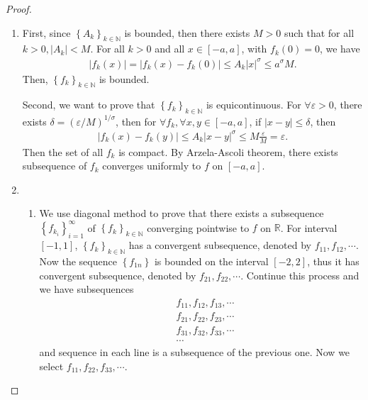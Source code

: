 \documentclass[11pt]{article}
\theoremstyle{definition}
\numberwithin{equation}{subsection}
\begin{document}
\begin{proof}
~\begin{enumerate}[label=(\alph*)]
    \item First, since $\left\{A_k\right\}_{k\in \mathbb{N}}$ is bounded, then there exists $M > 0$ such that for all $k > 0, \left|A_k\right| < M$. For all $k > 0$ and all $x\in [-a,a]$, with $f_k(0) = 0$, we have
    \begin{align*}
        \left|f_k(x)\right| = \left|f_k(x) - f_k(0)\right| \leq A_k |x|^\sigma \leq a^\sigma M.
    \end{align*}
    Then, $\left\{f_k\right\}_{k\in \mathbb{N}}$ is bounded.
    
    Second, we want to prove that $\left\{f_k\right\}_{k\in \mathbb{N}}$ is equicontinuous. For $\forall \varepsilon > 0$, there exists $\delta = \left(\varepsilon/M\right)^{1/\sigma}$, then for $\forall f_k, \forall x, y \in [-a,a]$, if $|x - y| \leq \delta$, then 
    \begin{align*}
        \left|f_k(x) - f_k(y)\right| \leq A_k |x - y|^\sigma \leq M \frac{\varepsilon}{M} = \varepsilon.
    \end{align*}
    Then the set of all $f_k$ is compact. By Arzela-Ascoli theorem, there exists subsequence of $f_k$ converges uniformly to $f$ on $[-a,a]$.
    
    \item 
    \begin{enumerate}[label = \arabic*)]
        \item We use diagonal method to prove that there exists a subsequence $\left\{f_{k_i}\right\}^\infty_{i=1}$ of $\left\{f_k\right\}_{k\in \mathbb{N}}$ converging pointwise to $f$ on $\mathbb{R}$. For interval $[-1,1]$, $\left\{f_k\right\}_{k\in \mathbb{N}}$ has a convergent subsequence, denoted by $f_{11}, f_{12}, \cdots$. Now the sequence $\left\{f_{1n}\right\}$ is bounded on the interval $[-2,2]$, thus it has convergent subsequence, denoted by $f_{21}, f_{22}, \cdots$. Continue this process and we have subsequences
        \begin{align*}
            & f_{11}, f_{12}, f_{13}, \cdots \\
            & f_{21}, f_{22}, f_{23}, \cdots \\
            & f_{31}, f_{32}, f_{33}, \cdots \\
            & \cdots 
        \end{align*}
        and sequence in each line is a subsequence of the previous one. Now we select $f_{11}, f_{22}, f_{33}, \cdots$. 
    

\end{enumerate}
\end{enumerate}
\end{proof}
\end{document}

